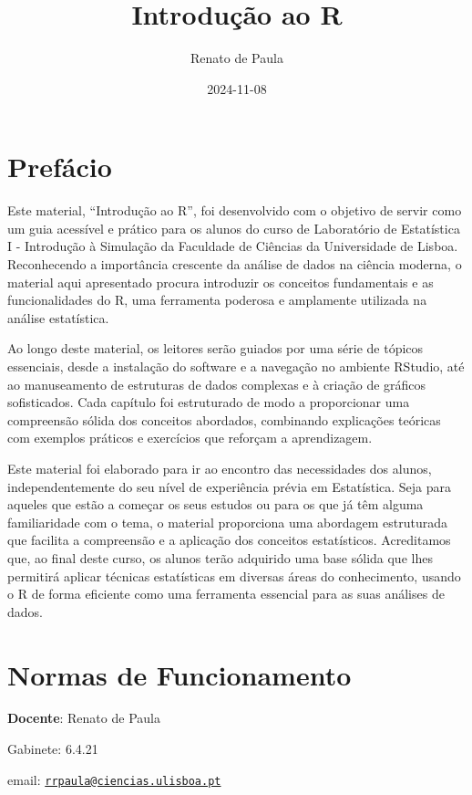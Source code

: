 \documentclass[
]{book}
\title{Introdução ao R}
\author{Renato de Paula}
\date{2024-11-08}
\begin{document}
\maketitle

{
\setcounter{tocdepth}{1}
\tableofcontents
}
\chapter{Prefácio}\label{prefuxe1cio}

Este material, ``Introdução ao R'', foi desenvolvido com o objetivo de servir como um guia acessível e prático para os alunos do curso de Laboratório de Estatística I - Introdução à Simulação da Faculdade de Ciências da Universidade de Lisboa. Reconhecendo a importância crescente da análise de dados na ciência moderna, o material aqui apresentado procura introduzir os conceitos fundamentais e as funcionalidades do R, uma ferramenta poderosa e amplamente utilizada na análise estatística.

Ao longo deste material, os leitores serão guiados por uma série de tópicos essenciais, desde a instalação do software e a navegação no ambiente RStudio, até ao manuseamento de estruturas de dados complexas e à criação de gráficos sofisticados. Cada capítulo foi estruturado de modo a proporcionar uma compreensão sólida dos conceitos abordados, combinando explicações teóricas com exemplos práticos e exercícios que reforçam a aprendizagem.

Este material foi elaborado para ir ao encontro das necessidades dos alunos, independentemente do seu nível de experiência prévia em Estatística. Seja para aqueles que estão a começar os seus estudos ou para os que já têm alguma familiaridade com o tema, o material proporciona uma abordagem estruturada que facilita a compreensão e a aplicação dos conceitos estatísticos. Acreditamos que, ao final deste curso, os alunos terão adquirido uma base sólida que lhes permitirá aplicar técnicas estatísticas em diversas áreas do conhecimento, usando o R de forma eficiente como uma ferramenta essencial para as suas análises de dados.

\chapter{Normas de Funcionamento}\label{normas-de-funcionamento}

\textbf{Docente}: Renato de Paula

Gabinete: 6.4.21

email:
\href{mailto:rrpaula@ciencias.ulisboa.pt}{\nolinkurl{rrpaula@ciencias.ulisboa.pt}}
\end{document}
